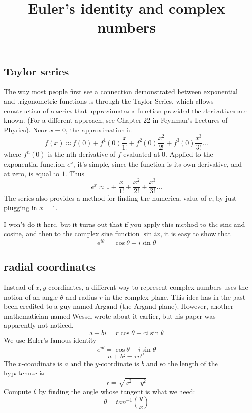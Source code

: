\documentclass[11pt, oneside]{article}   	%
\title{Euler's identity and complex numbers}
\date{}							%
\begin{document}
\maketitle
\Large
\noindent
\subsection*{Taylor series}
The way most people first see a connection demonstrated between exponential and trigonometric functions is through the Taylor Series, which allows construction of a series that approximates a function provided the derivatives are known.  (For a different approach, see Chapter 22 in Feynman's Lectures of Physics).  Near $x=0$, the approximation is
\[ f(x) \approx f(0) + f^1(0) \frac{x}{1!} + f^2(0) \frac{x^2}{2!} + f^3(0) \frac{x^3}{3!} \dots \]
where $f^n(0)$ is the nth derivative of $f$ evaluated at $0$.  Applied to the exponential function $e^x$, it's simple, since the function is its own derivative, and at zero, is equal to $1$.  Thus
\[ e^x \approx 1 + \frac{x}{1!} + \frac{x^2}{2!} + \frac{x^3}{3!} \dots \]
The series also provides a method for finding the numerical value of $e$, by just plugging in $x=1$.

I won't do it here, but it turns out that if you apply this method to the sine and cosine, and then to the complex sine function $\sin ix$, it is easy to show that
\[ e^{i\theta} = \cos \theta + i \sin \theta \]

\subsection*{radial coordinates}
Instead of $x,y$ ccordinates, a different way to represent complex numbers uses the notion of an angle $\theta$ and radius $r$ in the complex plane.  This idea has in the past been credited to a guy named Argand (the Argand plane).  However, another mathematician named Wessel wrote about it earlier, but his paper was apparently not noticed.
\[ a + bi = r \cos \theta + r i \sin \theta \]
We use Euler's famous identity
\[ e^{i\theta} = \cos \theta + i \sin \theta \]
\[ a + bi = r e^{i\theta} \]
The $x$-coordinate is $a$ and the $y$-coordinate is $b$ and so the length of the hypotenuse is 
\[ r = \sqrt{x^2 + y^2} \]
Compute $\theta$ by finding the angle whose tangent is what we need:
\[ \theta = tan^{-1} (\frac{y}{x}) \]
\end{document}
